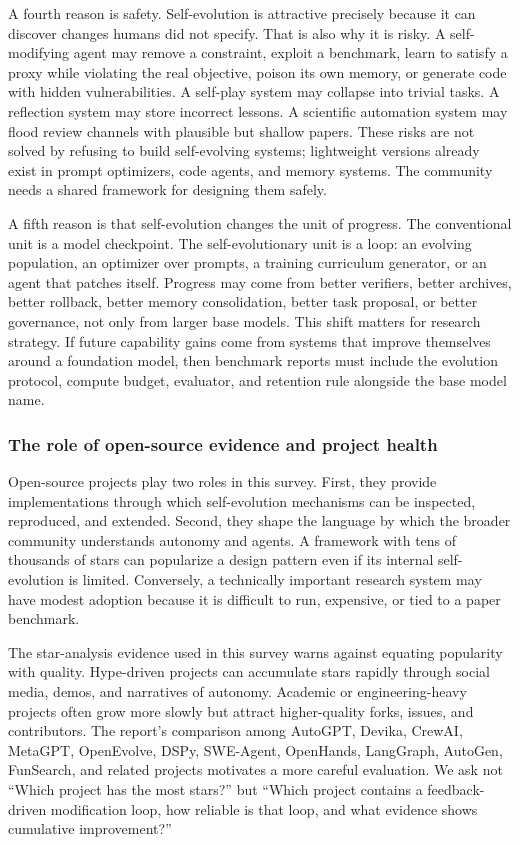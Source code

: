 A fourth reason is safety. Self-evolution is attractive precisely because it can discover changes humans did not specify. That is also why it is risky. A self-modifying agent may remove a constraint, exploit a benchmark, learn to satisfy a proxy while violating the real objective, poison its own memory, or generate code with hidden vulnerabilities. A self-play system may collapse into trivial tasks. A reflection system may store incorrect lessons. A scientific automation system may flood review channels with plausible but shallow papers. These risks are not solved by refusing to build self-evolving systems; lightweight versions already exist in prompt optimizers, code agents, and memory systems. The community needs a shared framework for designing them safely.

A fifth reason is that self-evolution changes the unit of progress. The conventional unit is a model checkpoint. The self-evolutionary unit is a loop: an evolving population, an optimizer over prompts, a training curriculum generator, or an agent that patches itself. Progress may come from better verifiers, better archives, better rollback, better memory consolidation, better task proposal, or better governance, not only from larger base models. This shift matters for research strategy. If future capability gains come from systems that improve themselves around a foundation model, then benchmark reports must include the evolution protocol, compute budget, evaluator, and retention rule alongside the base model name.

\subsubsection{The role of open-source evidence and project health}

Open-source projects play two roles in this survey. First, they provide implementations through which self-evolution mechanisms can be inspected, reproduced, and extended. Second, they shape the language by which the broader community understands autonomy and agents. A framework with tens of thousands of stars can popularize a design pattern even if its internal self-evolution is limited. Conversely, a technically important research system may have modest adoption because it is difficult to run, expensive, or tied to a paper benchmark.

The star-analysis evidence used in this survey warns against equating popularity with quality. Hype-driven projects can accumulate stars rapidly through social media, demos, and narratives of autonomy. Academic or engineering-heavy projects often grow more slowly but attract higher-quality forks, issues, and contributors. The report's comparison among AutoGPT, Devika, CrewAI, MetaGPT, OpenEvolve, DSPy, SWE-Agent, OpenHands, LangGraph, AutoGen, FunSearch, and related projects motivates a more careful evaluation. We ask not ``Which project has the most stars?'' but ``Which project contains a feedback-driven modification loop, how reliable is that loop, and what evidence shows cumulative improvement?''

